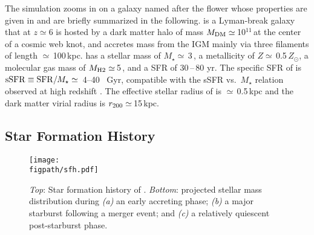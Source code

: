 \IfFileExists{emulateapjlegacy.cls}{\documentclass[iop]{emulateapjlegacy}}{\documentclass[iop]{emulateapj}}
\def\figpath{./Fig}
\begin{document}
The simulation zooms in on a galaxy named after the flower \flower whose properties are given in \citet{Pallottini17a} and are briefly summarized in the following. \flower is a Lyman-break galaxy that at $z\simeq 6$ is hosted by a dark matter halo of mass $M_{\rm DM}\simeq$\,10$^{11}$\,\Msun at the center of a cosmic web knot, and accretes mass from the IGM mainly via three filaments of length $\simeq$\,100\,kpc. \flower has a stellar mass of $M_\star\simeq$\,3\,\Msun, a metallicity of $Z\simeq$\,0.5\,$Z_{\odot}$, a molecular gas mass of $M_{\rm H2}\simeq$\,5\,\Msun, and a SFR of 30\,--\,80\,\Msun\,yr\pmOne.
%
The specific SFR of \flower is ${\rm sSFR} \equiv {\rm SFR}/M_{\star} \simeq$~4--40 ~Gyr\pmOne, compatible with the sSFR vs.\ $M_{\star}$ relation observed at high redshift \citep{Jiang16a}. The effective stellar radius of \flower is $\simeq$\,0.5\,kpc and the dark matter virial radius is $r_{\rm 200}\simeq$\,15\,kpc.

\subsection{Star Formation History} \label{sec:sfh}

\begin{figure*}[hptb]
\centering
\texttt{[image: \\figpath/sfh.pdf]}
\caption{
    {\it Top}: Star formation history of \flower. {\it Bottom}:
    projected stellar mass distribution during {\it (a)} an early
    accreting phase;  {\it (b)} a major starburst following a merger
    event; and {\it (c)} a relatively quiescent post-starburst
    phase.
\label{fig:SFH}}
\end{figure*}
\end{document}
